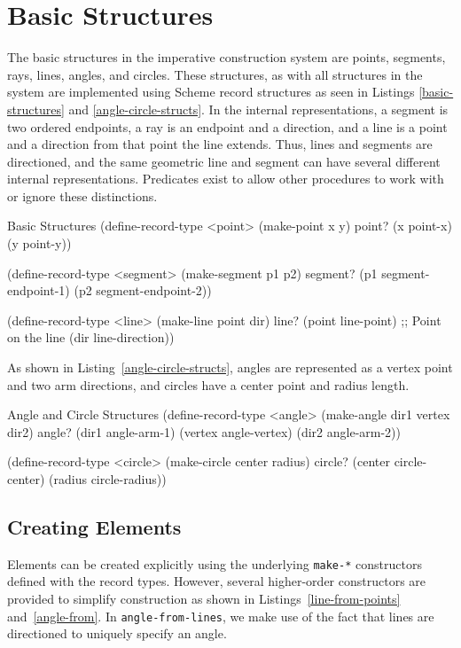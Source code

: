\section{Basic Structures}

The basic structures in the imperative construction system are points,
segments, rays, lines, angles, and circles. These structures, as with
all structures in the system are implemented using Scheme record
structures as seen in Listings \ref{basic-structures} and
\ref{angle-circle-structs}. In the internal representations, a segment
is two ordered endpoints, a ray is an endpoint and a direction, and a
line is a point and a direction from that point the line
extends. Thus, lines and segments are directioned, and the same
geometric line and segment can have several different internal
representations. Predicates exist to allow other procedures to work
with or ignore these distinctions.

\begin{code-listing}
[label=basic-structures]
{Basic Structures}
(define-record-type <point>
  (make-point x y)
  point?
  (x point-x)
  (y point-y))

(define-record-type <segment>
  (make-segment p1 p2)
  segment?
  (p1 segment-endpoint-1)
  (p2 segment-endpoint-2))

(define-record-type <line>
  (make-line point dir)
  line?
  (point line-point) ;; Point on the line
  (dir line-direction))
\end{code-listing}

As shown in Listing~\ref{angle-circle-structs}, angles are represented
as a vertex point and two arm directions, and circles have a center
point and radius length.

\begin{code-listing}
[label=angle-circle-structs]
{Angle and Circle Structures}
(define-record-type <angle>
  (make-angle dir1 vertex dir2)
  angle?
  (dir1 angle-arm-1)
  (vertex angle-vertex)
  (dir2 angle-arm-2))

(define-record-type <circle>
  (make-circle center radius)
  circle?
  (center circle-center)
  (radius circle-radius))
\end{code-listing}

\subsection{Creating Elements}

Elements can be created explicitly using the underlying
\texttt{make-*} constructors defined with the record types. However,
several higher-order constructors are provided to simplify
construction as shown in Listings~\ref{line-from-points}
and~\ref{angle-from}.  In \texttt{angle-from-lines}, we make use of
the fact that lines are directioned to uniquely specify an angle.

